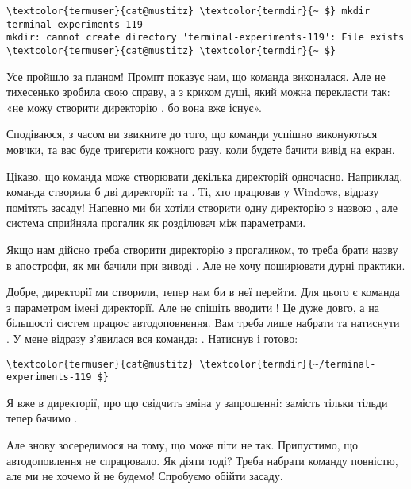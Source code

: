 \begin{Verbatim}[fontsize=\footnotesize,commandchars=\\\{\},xleftmargin=\parindent]
\textcolor{termuser}{cat@mustitz} \textcolor{termdir}{~ $} mkdir terminal-experiments-119
mkdir: cannot create directory 'terminal-experiments-119': File exists
\textcolor{termuser}{cat@mustitz} \textcolor{termdir}{~ $}
\end{Verbatim}

Усе пройшло за планом!
Промпт показує нам, що команда виконалася.
Але не тихесенько зробила свою справу, а з криком душі, який можна перекласти так:
«не можу створити директорію , бо вона вже існує».

Сподіваюся, з часом ви звикните до того, що команди успішно виконуються мовчки,
та вас буде тригерити кожного разу, коли будете бачити вивід на екран.

Цікаво, що команда  може створювати декілька директорій одночасно.
Наприклад, команда  створила б дві директорії:  та .
Ті, хто працював у Windows, відразу помітять засаду!
Напевно ми би хотіли створити одну директорію з назвою ,
але система сприйняла прогалик як розділювач між параметрами.

Якщо нам дійсно треба створити директорію з прогаликом,
то треба брати назву в апострофи, як ми бачили при виводі .
Але не хочу поширювати дурні практики.

Добре, директорії ми створили, тепер нам би в неї перейти.
Для цього є команда  з параметром імені директорії.
Але не спішіть вводити !
Це дуже довго, а на більшості систем працює автодоповнення.
Вам треба лише набрати  та натиснути \keys{\tab}.
У мене відразу з'явилася вся команда: .
Натиснув \keys{\return} і готово:

\begin{Verbatim}[fontsize=\footnotesize,commandchars=\\\{\},xleftmargin=\parindent]
\textcolor{termuser}{cat@mustitz} \textcolor{termdir}{~/terminal-experiments-119 $}
\end{Verbatim}

Я вже в директорії, про що свідчить зміна у запрошенні:
замість тільки тільди \file{\textasciitilde} тепер бачимо .

Але знову зосередимося на тому, що може піти не так.
Припустимо, що автодоповлення не спрацювало.
Як діяти тоді?
Треба набрати команду повністю, але ми не хочемо й не будемо!
Спробуємо обійти засаду.

